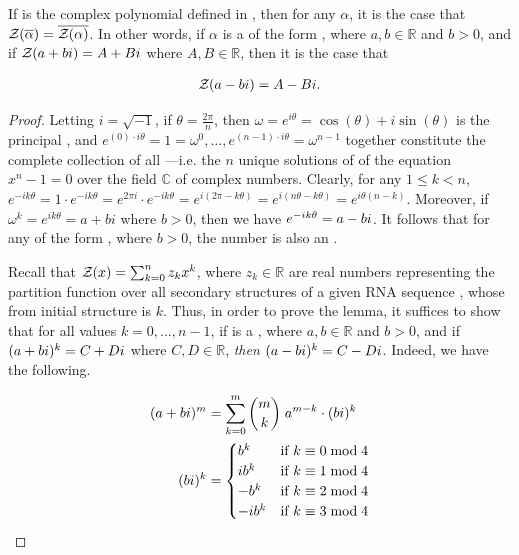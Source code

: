 \begin{lemma}
\label{lem:fftbor:compconj}

If \fullZx is the complex polynomial defined in
, then for any \nRoU
 $\alpha$, it is the case that ${\mathcal Z}_{}(\overline{\alpha}) =
\overline{{\mathcal Z}_{}(\alpha)}$. In other words, if $\alpha$ is a \nRoU
 of the form \aPbi, where $a,b \in \mathbb{R}$ and $b>0$, and
if ${\mathcal Z}_{}(a+bi) = A + Bi$ where $A,B \in \mathbb{R}$, then it is the case that

\begin{align}
{\mathcal Z}_{}(a-bi) = A - Bi.
\end{align}

\end{lemma}

\begin{proof}
Letting $i = \sqrt{-1}$, if
$\theta = \frac{2 \pi}{n}$, then
$\omega = e^{i \theta} = \cos(\theta) + i \sin(\theta)$
is the principal \nRoU, and
$e^{(0) \cdot i \theta} = 1 = \omega^{0}, \dots ,
e^{(n-1) \cdot i \theta} = \omega^{n-1}$ together
constitute the complete collection of all
\nRoUs---i.e. the $n$ unique solutions of
of the equation $x^n -1 = 0$ over the field $\mathbb{C}$ of complex numbers.
Clearly, for any $1 \leq k < n$,
$e^{-i k \theta} = 1 \cdot e^{-i k \theta} =
e^{2 \pi i} \cdot e^{-i k \theta} = e^{i(2 \pi - k \theta)} =
e^{i(n \theta - k \theta)} = e^{i \theta (n - k)}$.
Moreover, if $\omega^k = e^{i k \theta} = a + b i$ where
$b>0$, then we have $e^{-i k \theta} = a-bi$. It follows that for any
\nRoU of the form \aPbi, where $b>0$, the number \aMbi
is also an \nRoU.

Recall that ${\mathcal Z}_{}(x) = \sum_{k=0}^n z_k x^k$, where
$z_k \in \mathbb{R}$ are real numbers representing the partition function
 over
all secondary structures of a given RNA sequence \seqN,
whose \bpd from initial structure
\strSt is $k$. Thus, in order to prove the lemma, it suffices to show
that for all values $k=0,\dots,n-1$, if \aPbi is a
\nRoU, where $a,b \in \mathbb{R}$
and $b>0$, and if $(a+bi)^k = C+Di$ where $C,D \in \mathbb{R}$, {\em then}
$(a-bi)^k = C-Di$. Indeed, we have the following.

\begin{align}
\begin{split}
(a+bi)^m &= \sum_{k=0}^m \binom{m}{k}\; a^{m-k} \cdot (bi)^k \\
(bi)^k  &=
\begin{cases}
b^k    & \text{if $k \equiv 0 \bmod 4$} \\
i b^k  & \text{if $k \equiv 1 \bmod 4$} \\
-b^k   & \text{if $k \equiv 2 \bmod 4$} \\
-i b^k & \text{if $k \equiv 3 \bmod 4$} \\
\end{cases}
\end{split}
\end{align}


\end{proof}
